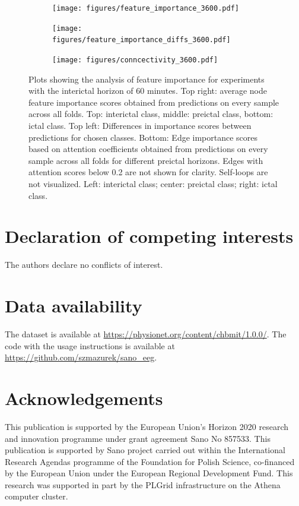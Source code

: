 \documentclass[a4paper,fleqn]{cas-sc}
\begin{document}
\FloatBarrier
\begin{figure}[h]
	\centering
	\begin{subfigure}{0.45\linewidth}
		\texttt{[image: figures/feature\_importance\_3600.pdf]}
		\label{fig:feature-importance-relative-60mins}
	\end{subfigure}
	\begin{subfigure}{0.45\linewidth}
		\texttt{[image: figures/feature\_importance\_diffs\_3600.pdf]}
		\label{fig:feature-importance-diffs-60mins}
	\end{subfigure}
        \vfill
        \begin{subfigure}{1\linewidth}
        \centering
		\texttt{[image: figures/conncectivity\_3600.pdf]}
		\label{fig:connectivity-60mins}
	\end{subfigure}
 
	\caption{Plots showing the analysis of feature importance for experiments with the interictal horizon of 60 minutes. Top right: average node feature importance scores obtained from predictions on every sample across all folds. Top: interictal class, middle: preictal class, bottom: ictal class. Top left: Differences in importance scores between predictions
for chosen classes. Bottom: Edge importance scores based on attention coefficients obtained from predictions on every sample across all folds for different preictal horizons. Edges with attention scores below 0.2 are not shown for clarity. Self-loops are not visualized. Left: interictal class; center: preictal class; right: ictal class.}
	\label{fig:feature-explainability-60-mins}
\end{figure}
\FloatBarrier



\printcredits

\section*{Declaration of competing interests}
The authors declare no conflicts of interest.
\section*{Data availability}
The dataset is available at \url{https://physionet.org/content/chbmit/1.0.0/}. The code with the usage instructions is available at \url{https://github.com/szmazurek/sano_eeg}.
\section*{Acknowledgements}
This publication is supported by the European Union’s Horizon 2020 research and
innovation programme under grant agreement Sano No 857533.
This publication is supported by Sano project carried out within the International Research Agendas programme of the Foundation for Polish Science, co-financed by the European Union under the European Regional Development Fund. This research was supported in part by the PLGrid infrastructure on the Athena computer cluster.

% 
\end{document}
